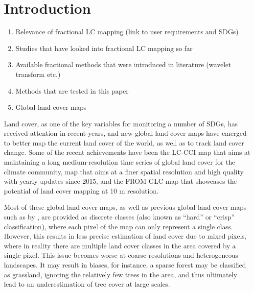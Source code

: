 \documentclass[a4paper,10pt]{article}
\begin{document}
\pagebreak
\tableofcontents
\pagebreak

\section{Introduction}

\begin{enumerate}
 \item Relevance of fractional LC mapping (link to user requirements and SDGs)
 \item Studies that have looked into fractional LC mapping so far
 \item Available fractional methods that were introduced in literature (wavelet transform etc.)
 \item Methods that are tested in this paper
 \item Global land cover maps
\end{enumerate}

Land cover, as one of the key variables for monitoring a number of \glspl{SDG}, has received attention in recent years, and new global land cover maps have emerged to better map the current land cover of the world, as well as to track land cover change.
Some of the recent achievements have been the \ac{LC-CCI} map  that aims at maintaining a long medium-resolution time series of global land cover for the climate community,  map that aims at a finer spatial resolution and high quality with yearly updates since 2015, and the \ac{FROM-GLC} map \citep{fromglc2019} that showcases the potential of land cover mapping at 10 m resolution.

Most of these global land cover maps, as well as previous global land cover maps such as by \citet{bartholome2005glc2000, friedl2010modis, arino2007globcover, see2015hybrid, chen2015globeland30}, are provided as discrete classes (also known as ``hard'' or ``crisp'' classification), where each pixel of the map can only represent a single class.
However, this results in less precise estimation of land cover due to mixed pixels, where in reality there are multiple land cover classes in the area covered by a single pixel.
This issue becomes worse at coarse resolutions and heterogeneous landscapes.
It may result in biases, for instance, a sparse forest may be classified as grassland, ignoring the relatively few trees in the area, and thus ultimately lead to an underestimation of tree cover at large scales.
\end{document}
